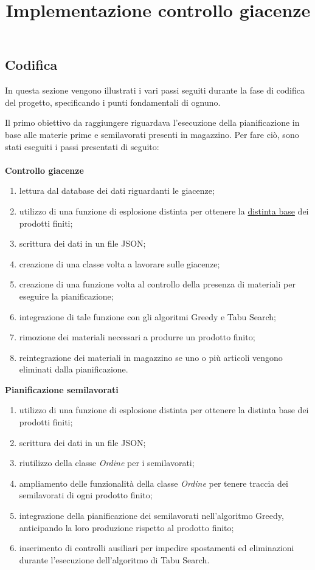 \subsection{Codifica}

In questa sezione vengono illustrati i vari passi seguiti durante la fase di codifica del progetto, specificando i punti fondamentali di ognuno.\\

\title{Implementazione controllo giacenze}

Il primo obiettivo da raggiungere riguardava l'esecuzione della pianificazione in base alle materie prime e semilavorati presenti in magazzino.
Per fare ciò, sono stati eseguiti i passi presentati di seguito:\\ \\
\textbf{Controllo giacenze}
\begin{enumerate}
        \item lettura dal database dei dati riguardanti le giacenze;
        \item utilizzo di una funzione di esplosione distinta per ottenere la \hyperref[Distinta base]{distinta base\glo} dei prodotti finiti; 
        \item scrittura dei dati in un file JSON;
        \item creazione di una classe volta a lavorare sulle giacenze;
        \item creazione di una funzione volta al controllo della presenza di materiali per eseguire la pianificazione;
        \item integrazione di tale funzione con gli algoritmi Greedy e Tabu Search;
        \item rimozione dei materiali necessari a produrre un prodotto finito;
        \item reintegrazione dei materiali in magazzino se uno o più articoli vengono eliminati dalla pianificazione.\\
\end{enumerate}

\textbf{Pianificazione semilavorati} 
\begin{enumerate}
        \item utilizzo di una funzione di esplosione distinta per ottenere la distinta base dei prodotti finiti; 
        \item scrittura dei dati in un file JSON;
        \item riutilizzo della classe \textit{Ordine} per i semilavorati;
        \item ampliamento delle funzionalità della classe \textit{Ordine} per tenere traccia dei semilavorati di ogni prodotto finito;
        \item integrazione della pianificazione dei semilavorati nell'algoritmo Greedy, anticipando la loro produzione rispetto al prodotto finito;
        \item inserimento di controlli ausiliari per impedire spostamenti ed eliminazioni durante l'esecuzione dell'algoritmo di Tabu Search.\\
\end{enumerate}

